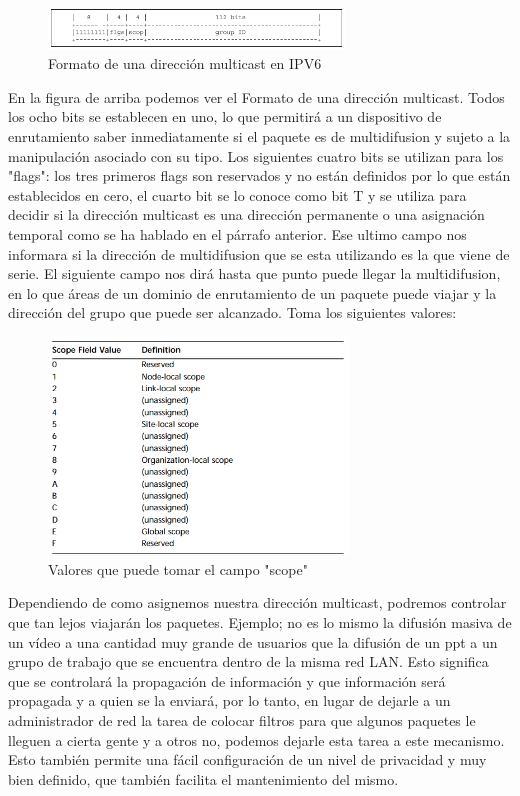 \documentclass[11pt,a4paper]{article}
\begin{document}
\begin{figure}[h!]
 \centering
 \includegraphics[width=0.7\textwidth]{formato_multicast.png}
 \caption[Formato Multicast]{Formato de una dirección multicast en IPV6}
\end{figure} \par
En la figura de arriba podemos ver el Formato de una dirección multicast. Todos los ocho bits se 
establecen en uno, lo que permitirá a un dispositivo de enrutamiento saber inmediatamente si el 
paquete es de multidifusion y sujeto a la manipulación asociado con su tipo. Los siguientes cuatro 
bits se utilizan para los "flags": los tres primeros flags son reservados y no están definidos por 
lo que están establecidos en cero, el cuarto bit se lo conoce como bit T y se utiliza para decidir 
si la dirección multicast es una dirección permanente o una asignación temporal como se ha hablado 
en el párrafo anterior. Ese ultimo campo nos informara si la dirección de multidifusion que se esta 
utilizando es la que viene de serie. El siguiente campo nos dirá hasta que punto puede llegar la 
multidifusion, en lo que áreas de un dominio de enrutamiento de un paquete puede viajar y la 
dirección del grupo que puede ser alcanzado. Toma los siguientes valores:\par

\begin{figure}[h!]
 \centering
 \includegraphics[width=0.71\textwidth]{valoresM.png}
 \caption[Valores del campo scope]{Valores que puede tomar el campo "scope"}
\end{figure} \par

Dependiendo de como asignemos nuestra dirección multicast, podremos controlar que tan lejos viajarán 
los paquetes. Ejemplo; no es lo mismo la difusión masiva de un vídeo a una cantidad muy grande de 
usuarios que la difusión de un ppt a un grupo de trabajo que se encuentra dentro de la misma red 
LAN. Esto significa que se controlará la propagación de información y que información será propagada 
y a quien se la enviará, por lo tanto, en lugar de dejarle a un administrador de red la tarea de 
colocar filtros para que algunos paquetes le lleguen a cierta gente y a otros no, podemos dejarle 
esta tarea a este mecanismo. Esto también permite una fácil configuración de un nivel de privacidad 
y muy bien definido, que también facilita el mantenimiento del mismo.
\end{document}
